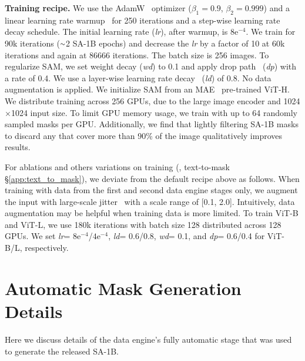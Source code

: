 \documentclass[10pt,twocolumn,letterpaper]{article}
\renewcommand{\paragraph}[1]{\vspace{1.25mm}\noindent\textbf{#1}}
\newcommand{\app}{\raise.17ex\hbox{$\scriptstyle\sim$}}
\newcommand{\x}{{\times}}
\newcommand{\sad}{\mbox{SA-1B}\xspace}
\newcommand{\sam}{SAM\xspace}
\newcommand{\lr}{\emph{lr}\xspace}
\newcommand{\ld}{\emph{ld}\xspace}
\newcommand{\wtd}{\emph{wd}\xspace}
\newcommand{\drp}{\emph{dp}\xspace}
\newcommand{\expnum}[2]{{#1}\mathrm{e}^{#2}}
\begin{document}
\paragraph{Training recipe.} We use the AdamW~\cite{Loshchilov2019} optimizer ($\beta_1=0.9$, $\beta_2=0.999$) and a linear learning rate warmup~\cite{Goyal2017} for 250 iterations and a step-wise learning rate decay schedule. The initial learning rate (\lr), after warmup, is $\expnum{8}{-4}$. We train for 90k iterations ($\app$2 \sad epochs) and decrease the \lr by a factor of 10 at 60k iterations and again at 86666 iterations. The batch size is 256 images. To regularize \sam, we set weight decay (\wtd) to 0.1 and apply drop path~\cite{Huang2016deep} (\drp) with a rate of 0.4. We use a layer-wise learning rate decay~\cite{Bao2021} (\ld) of 0.8. No data augmentation is applied. We initialize \sam from an MAE~\cite{he2022masked} pre-trained ViT-H. We distribute training across 256 GPUs, due to the large image encoder and 1024$\x$1024 input size. To limit GPU memory usage, we train with up to 64 randomly sampled masks per GPU. Additionally, we find that lightly filtering \sad masks to discard any that cover more than 90\% of the image qualitatively improves results.

For ablations and others variations on training (\eg, text-to-mask \S\ref{app:text_to_mask}), we deviate from the default recipe above as follows. When training with data from the first and second data engine stages only, we augment the input with large-scale jitter~\cite{Ghiasi2021} with a scale range of [0.1, 2.0]. Intuitively, data augmentation may be helpful when training data is more limited. To train ViT-B and ViT-L, we use 180k iterations with batch size 128 distributed across 128 GPUs. We set \lr = $\expnum{8}{-4}$/$\expnum{4}{-4}$, \ld = 0.6/0.8, \wtd = 0.1, and \drp = 0.6/0.4 for ViT-B/L, respectively.

\section{Automatic Mask Generation Details}\label{app:dataset_generation}

Here we discuss details of the data engine's fully automatic stage that was used to generate the released \sad.
\end{document}
